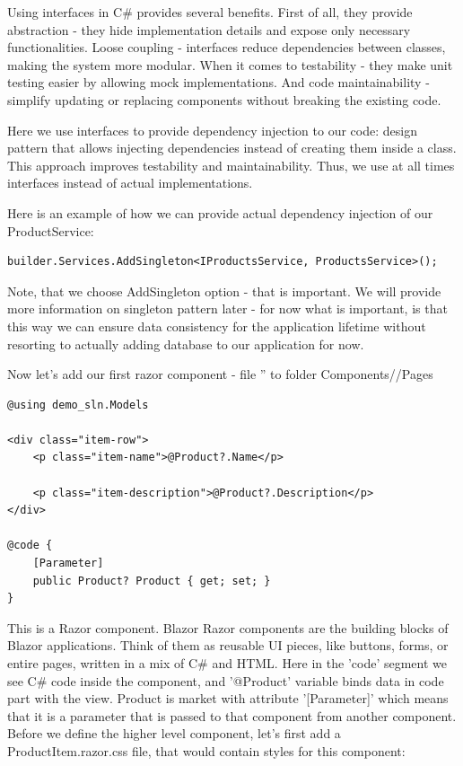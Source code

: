 Using interfaces in C\# provides several benefits. First of all, they provide abstraction - they hide implementation details and expose only necessary functionalities. Loose coupling - interfaces reduce dependencies between classes, making the system more modular. When it comes to testability - they make unit testing easier by allowing mock implementations. And code maintainability - simplify updating or replacing components without breaking the existing code.

Here we use interfaces to provide dependency injection to our code: design pattern that allows injecting dependencies instead of creating them inside a class. This approach improves testability and maintainability. Thus, we use at all times interfaces instead of actual implementations.


Here is an example of how we can provide actual dependency injection of our ProductService:

\begin{lstlisting}
builder.Services.AddSingleton<IProductsService, ProductsService>();
\end{lstlisting}

Note, that we choose AddSingleton option - that is important. We will provide more information on singleton pattern later - for now what is important, is that this way we can ensure data consistency for the application lifetime without resorting to actually adding database to our application for now.

Now let's add our first razor component - file '' to folder Components//Pages

\begin{lstlisting}
@using demo_sln.Models

<div class="item-row">
    <p class="item-name">@Product?.Name</p>

    <p class="item-description">@Product?.Description</p>
</div>

@code {
    [Parameter]
    public Product? Product { get; set; }
}

\end{lstlisting}

This is a Razor component. Blazor Razor components are the building blocks of Blazor applications. Think of them as reusable UI pieces, like buttons, forms, or entire pages, written in a mix of C\# and HTML. Here in the 'code' segment we see C\# code inside the component, and '@Product' variable binds data in code part with the view. Product is market with attribute '[Parameter]' which means that it is a parameter that is passed to that component from another component. Before we define the higher level component, let's first add a ProductItem.razor.css file, that would contain styles for this component:

